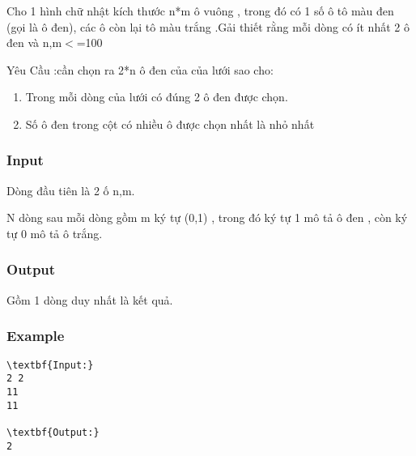 

Cho 1 hình chữ nhật kích thước n*m ô vuông , trong đó có 1 số ô tô màu đen (gọi là ô đen), các ô còn lại tô màu trắng .Gải thiết rằng mỗi dòng có ít nhất 2 ô đen và n,m$<$=100

Yêu Cầu :cần chọn ra 2*n ô đen của của lưới sao cho:
\begin{enumerate}
	\item Trong mỗi dòng của lưới có đúng 2 ô đen được chọn.
	\item Số ô đen trong cột có nhiều ô được chọn nhất là nhỏ nhất
\end{enumerate}

\subsubsection{Input}

Dòng đầu tiên là 2 ố n,m.

N dòng sau mỗi dòng gồm m ký tự (0,1) , trong đó ký tự 1 mô tả ô đen , còn ký tự 0 mô tả ô trắng.

\subsubsection{Output}

Gồm 1 dòng duy nhất là kết quả.

\subsubsection{Example}
\begin{verbatim}
\textbf{Input:}
2 2
11
11

\textbf{Output:}
2\end{verbatim}